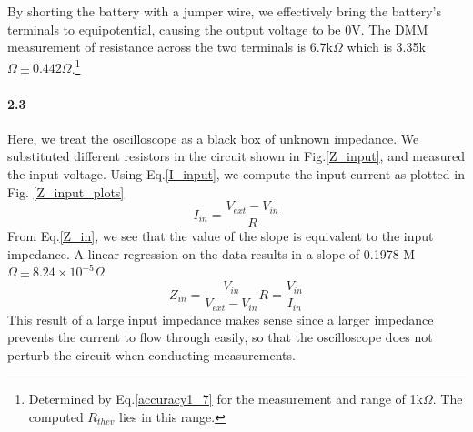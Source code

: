 \documentclass[authoryear, 12pt,5p, times]{elsarticle}
\begin{document}
By shorting the battery with a jumper wire, we effectively bring the battery's terminals to equipotential, causing the output voltage to be 0V. The DMM measurement of resistance across the two terminals is 6.7k$\Omega$ which is 3.35k$\Omega\pm 0.442\Omega$.\footnote{Determined  by Eq.\ref{accuracy1_7} for the measurement and range of 1k$\Omega$. The computed $R_{thev}$ lies in this range.}
\paragraph{\textbf{2.3}}
Here, we treat the oscilloscope as a black box of unknown impedance.  We substituted different resistors in the circuit shown in  Fig.\ref{Z_input}, and measured the input voltage. Using Eq.\ref{I_input}, we compute the input current as plotted in Fig. \ref{Z_input_plots}
\begin{equation}
I_{in} =\frac{V_{ext}-V_{in}}{R}
\label{I_input}
\end{equation}
From Eq.\ref{Z_in}, we see that the value of the slope is equivalent to the input impedance. A linear regression on the data results in a slope of 0.1978 M$\Omega\pm 8.24\times10^{-5}\Omega$. 
\begin{equation}
Z_{in}=\frac{V_{in}}{V_{ext}-V_{in}}R =\frac{V_{in}}{I_{in}}
\label{Z_in}
\end{equation}This result of a large input impedance makes sense since a larger impedance prevents the current to flow through easily, so that the oscilloscope does not perturb the circuit when conducting measurements.
\end{document}
